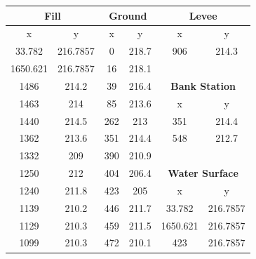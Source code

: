 \begin{center}

\begin{tabular}{|cc||cc||cc|} 
    \hline
    \multicolumn{2}{|c||}{\textbf{Fill }} & \multicolumn{2}{c||}{\textbf{Ground }} & \multicolumn{2}{c|}{\textbf{Levee }}           \\ 
    \hline
    x        & y                         & x    & y                              & x        & y                                   \\
    33.782   & 216.7857                  & 0    & 218.7                          & 906      & 214.3                               \\
    1650.621 & 216.7857                  & 16   & 218.1                          &          &                                     \\
    1486     & 214.2                     & 39   & 216.4                          & \multicolumn{2}{c|}{\textbf{Bank Station }}    \\ 
    \cline{5-6}
    1463     & 214                       & 85   & 213.6                          & x        & y                                   \\
    1440     & 214.5                     & 262  & 213                            & 351      & 214.4                               \\
    1362     & 213.6                     & 351  & 214.4                          & 548      & 212.7                               \\
    1332     & 209                       & 390  & 210.9                          &          &                                     \\
    1250     & 212                       & 404  & 206.4                          & \multicolumn{2}{c|}{\textbf{Water Surface }}   \\ 
    \cline{5-6}
    1240     & 211.8                     & 423  & 205                            & x        & y                                   \\
    1139     & 210.2                     & 446  & 211.7                          & 33.782   & 216.7857                            \\
    1129     & 210.3                     & 459  & 211.5                          & 1650.621 & 216.7857                            \\
    1099     & 210.3                     & 472  & 210.1                          & 423      & 216.7857                            \\

\end{tabular}
\end{center}
